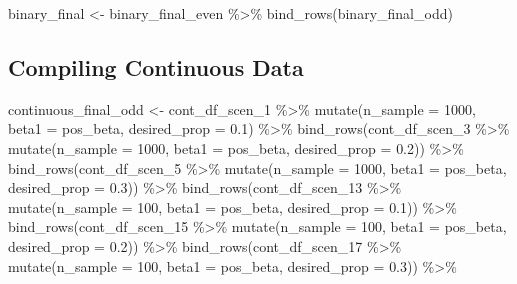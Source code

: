 \documentclass[
]{article}
\newenvironment{Shaded}{\begin{snugshade}}{\end{snugshade}}
\newcommand{\AttributeTok}[1]{\textcolor[rgb]{0.77,0.63,0.00}{#1}}
\newcommand{\DecValTok}[1]{\textcolor[rgb]{0.00,0.00,0.81}{#1}}
\newcommand{\FloatTok}[1]{\textcolor[rgb]{0.00,0.00,0.81}{#1}}
\newcommand{\FunctionTok}[1]{\textcolor[rgb]{0.00,0.00,0.00}{#1}}
\newcommand{\NormalTok}[1]{#1}
\newcommand{\OtherTok}[1]{\textcolor[rgb]{0.56,0.35,0.01}{#1}}
\newcommand{\SpecialCharTok}[1]{\textcolor[rgb]{0.00,0.00,0.00}{#1}}
\begin{document}
\begin{Shaded}
\begin{Highlighting}[]
\NormalTok{binary\_final }\OtherTok{\textless{}{-}}\NormalTok{ binary\_final\_even }\SpecialCharTok{\%\textgreater{}\%} \FunctionTok{bind\_rows}\NormalTok{(binary\_final\_odd)}
\end{Highlighting}
\end{Shaded}

\hypertarget{compiling-continuous-data}{%
\subsection{Compiling Continuous Data}\label{compiling-continuous-data}}

\begin{Shaded}
\begin{Highlighting}[]
\NormalTok{continuous\_final\_odd }\OtherTok{\textless{}{-}} 
\NormalTok{  cont\_df\_scen\_1 }\SpecialCharTok{\%\textgreater{}\%} \FunctionTok{mutate}\NormalTok{(}\AttributeTok{n\_sample =} \DecValTok{1000}\NormalTok{, }\AttributeTok{beta1 =}\NormalTok{ pos\_beta, }\AttributeTok{desired\_prop =} \FloatTok{0.1}\NormalTok{) }\SpecialCharTok{\%\textgreater{}\%} 
  \FunctionTok{bind\_rows}\NormalTok{(cont\_df\_scen\_3 }\SpecialCharTok{\%\textgreater{}\%} \FunctionTok{mutate}\NormalTok{(}\AttributeTok{n\_sample =} \DecValTok{1000}\NormalTok{, }\AttributeTok{beta1 =}\NormalTok{ pos\_beta, }\AttributeTok{desired\_prop =} \FloatTok{0.2}\NormalTok{)) }\SpecialCharTok{\%\textgreater{}\%} 
  \FunctionTok{bind\_rows}\NormalTok{(cont\_df\_scen\_5 }\SpecialCharTok{\%\textgreater{}\%} \FunctionTok{mutate}\NormalTok{(}\AttributeTok{n\_sample =} \DecValTok{1000}\NormalTok{, }\AttributeTok{beta1 =}\NormalTok{ pos\_beta, }\AttributeTok{desired\_prop =} \FloatTok{0.3}\NormalTok{)) }\SpecialCharTok{\%\textgreater{}\%} 
  \FunctionTok{bind\_rows}\NormalTok{(cont\_df\_scen\_13 }\SpecialCharTok{\%\textgreater{}\%} \FunctionTok{mutate}\NormalTok{(}\AttributeTok{n\_sample =} \DecValTok{100}\NormalTok{, }\AttributeTok{beta1 =}\NormalTok{ pos\_beta, }\AttributeTok{desired\_prop =} \FloatTok{0.1}\NormalTok{)) }\SpecialCharTok{\%\textgreater{}\%} 
  \FunctionTok{bind\_rows}\NormalTok{(cont\_df\_scen\_15 }\SpecialCharTok{\%\textgreater{}\%} \FunctionTok{mutate}\NormalTok{(}\AttributeTok{n\_sample =} \DecValTok{100}\NormalTok{, }\AttributeTok{beta1 =}\NormalTok{ pos\_beta, }\AttributeTok{desired\_prop =} \FloatTok{0.2}\NormalTok{)) }\SpecialCharTok{\%\textgreater{}\%} 
  \FunctionTok{bind\_rows}\NormalTok{(cont\_df\_scen\_17 }\SpecialCharTok{\%\textgreater{}\%} \FunctionTok{mutate}\NormalTok{(}\AttributeTok{n\_sample =} \DecValTok{100}\NormalTok{, }\AttributeTok{beta1 =}\NormalTok{ pos\_beta, }\AttributeTok{desired\_prop =} \FloatTok{0.3}\NormalTok{)) }\SpecialCharTok{\%\textgreater{}\%} 

\end{Highlighting}
\end{Shaded}
\end{document}
